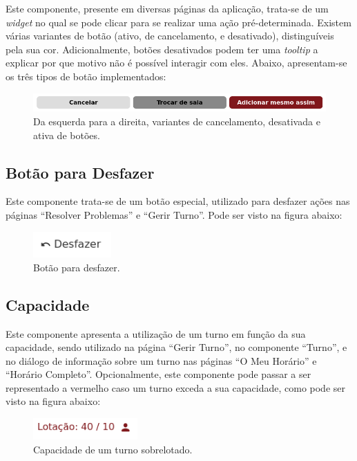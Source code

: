 \documentclass[12pt, a4paper]{article}
\begin{document}
Este componente, presente em diversas páginas da aplicação, trata-se de um \emph{widget} no qual se
pode clicar para se realizar uma ação pré-determinada. Existem várias variantes de botão (ativo, de
cancelamento, e desativado), distinguíveis pela sua cor. Adicionalmente, botões desativados podem
ter uma \emph{tooltip} a explicar por que motivo não é possível interagir com eles. Abaixo,
apresentam-se os três tipos de botão implementados:

\begin{figure}[H]
    \centering
    \includegraphics[width=\textwidth]{res/components/button.png}
    \caption{Da esquerda para a direita, variantes de cancelamento, desativada e ativa de botões.}
    \label{button}
\end{figure}

\subsection{Botão para Desfazer}

Este componente trata-se de um botão especial, utilizado para desfazer ações nas páginas
``Resolver Problemas'' e ``Gerir Turno''. Pode ser visto na figura abaixo:

\begin{figure}[H]
    \centering
    \includegraphics[width=3cm]{res/components/undo-button.png}
    \caption{Botão para desfazer.}
    \label{undo-button}
\end{figure}

\subsection{Capacidade}

Este componente apresenta a utilização de um turno em função da sua capacidade, sendo utilizado na
página ``Gerir Turno'', no componente ``Turno'', e no diálogo de informação sobre um turno nas
páginas ``O Meu Horário'' e ``Horário Completo''. Opcionalmente, este componente pode passar a ser
representado a vermelho caso um turno exceda a sua capacidade, como pode ser visto na figura abaixo:

\begin{figure}[H]
    \centering
    \includegraphics[width=4cm]{res/components/capacity.png}
    \caption{Capacidade de um turno sobrelotado.}
    \label{capacity}
\end{figure}
\end{document}
